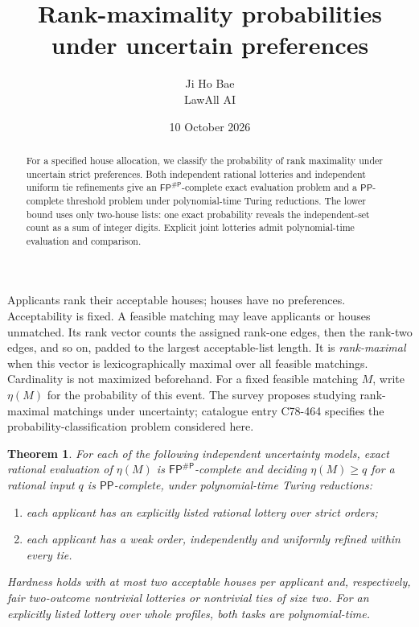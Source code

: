 \documentclass[10pt]{article}
\title{Rank-maximality probabilities under uncertain preferences}
\author{Ji Ho Bae\\\small LawAll AI}
\date{10 October 2026}
\newtheorem{theorem}{Theorem}
\newcommand{\FP}{\mathsf{FP}}
\newcommand{\PP}{\mathsf{PP}}
\newcommand{\sharpP}{\mathsf{\#P}}
\begin{document}
\makeatletter
\begin{center}
{\Large\@title\par}
\medskip
{\normalsize\@author\par}
\smallskip
{\small\@date\par}
\end{center}
\makeatother
\begin{abstract}
For a specified house allocation, we classify the probability of rank
maximality under uncertain strict preferences. Both independent rational
lotteries and independent uniform tie refinements give an
$\FP^{\sharpP}$-complete exact evaluation problem and a
$\PP$-complete threshold problem under polynomial-time Turing reductions.
The lower bound uses only two-house lists: one exact probability reveals
the independent-set count as a sum of integer digits. Explicit joint
lotteries admit polynomial-time evaluation and comparison.
\end{abstract}

Applicants rank their acceptable houses; houses have no preferences.
Acceptability is fixed. A feasible matching may leave applicants or houses
unmatched. Its rank vector counts the assigned rank-one edges, then the
rank-two edges, and so on, padded to the largest acceptable-list length.
It is \emph{rank-maximal} when this vector is lexicographically maximal
over all feasible matchings. Cardinality is not maximized beforehand.
For a fixed feasible matching $M$, write $\eta(M)$ for the probability
of this event. The survey \cite[\S3.1.2]{survey} proposes studying
rank-maximal matchings under uncertainty; catalogue entry C78-464
specifies the probability-classification problem considered here.

\begin{theorem}\label{thm:main}
For each of the following independent uncertainty models, exact rational
evaluation of $\eta(M)$ is $\FP^{\sharpP}$-complete and deciding
$\eta(M)\geq q$ for a rational input $q$ is $\PP$-complete, under
polynomial-time Turing reductions:
\begin{enumerate}
\item each applicant has an explicitly listed rational lottery over strict
orders;
\item each applicant has a weak order, independently and uniformly refined
within every tie.
\end{enumerate}
Hardness holds with at most two acceptable houses per applicant and,
respectively, fair two-outcome nontrivial lotteries or nontrivial ties
of size two. For an
explicitly listed lottery over whole profiles, both tasks are polynomial-time.
\end{theorem}
\end{document}
